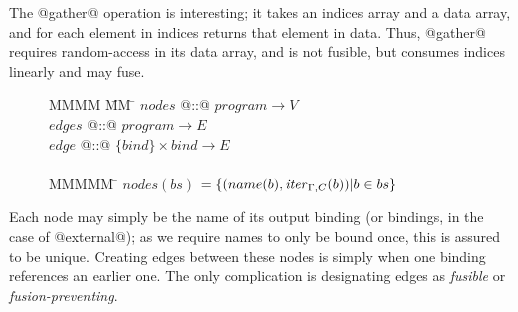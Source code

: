 The @gather@ operation is interesting; it takes an indices array and a data array, and for each element in indices returns that element in data.
Thus, @gather@ requires random-access in its data array, and is not fusible, but consumes indices linearly and may fuse.

\begin{figure}[H]
\begin{tabbing}
MMMM        \= MM   \= \kill
$nodes$     \> @::@ \> $program \to V$          \\
$edges$     \> @::@ \> $program \to E$          \\
$edge$      \> @::@ \> $\{bind\} \times bind \to E$\\
\\
MMMMM       \= \kill
$nodes(bs)$ \> $= \{(name(b), \mathit{iter}_{\Gamma,C}(b)) | b \in bs\}$       \\
\end{tabbing}
\end{figure}
Each node may simply be the name of its output binding (or bindings, in the case of @external@); as we require names to only be bound once, this is assured to be unique.
Creating edges between these nodes is simply when one binding references an earlier one. The only complication is designating edges as \emph{fusible} or \emph{fusion-preventing}.

